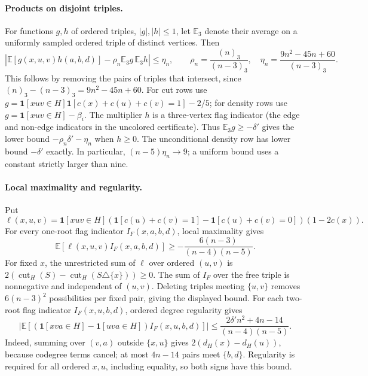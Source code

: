 \documentclass[11pt]{article}
\DeclareMathOperator{\cut}{cut}
\newcommand{\EE}{\mathbb E}
\newcommand{\ind}{\mathbf 1}
\newcommand{\fall}[2]{(#1)_{#2}}
\begin{document}
\begin{appendices}
\paragraph{Products on disjoint triples.}
For functions $g,h$ of ordered triples, $|g|,|h|\le1$, let $\EE_3$
denote their average on a uniformly sampled ordered triple of distinct
vertices. Then
\[
 \left|\EE[g(x,u,v)h(a,b,d)]-\rho_n\EE_3g\,\EE_3h\right|
 \le\eta_n,\qquad
 \rho_n=\frac{\fall n3}{\fall{n-3}3},\quad
 \eta_n=\frac{9n^2-45n+60}{\fall{n-3}3}.
\]
This follows by removing the pairs of triples that intersect, since
$\fall n3-\fall{n-3}3=9n^2-45n+60$.
For cut rows use
$g=\ind[xuv\in H]\ind[c(x)+c(u)+c(v)=1]-2/5$;
for density rows use $g=\ind[xuv\in H]-\beta_i$.
The multiplier $h$ is a three-vertex flag indicator (the edge and
non-edge indicators in the uncolored certificate). Thus
$\EE_3g\ge-\delta'$ gives the lower bound
$-\rho_n\delta'-\eta_n$ when $h\ge0$.
The unconditional density row has lower bound $-\delta'$ exactly.
In particular, $(n-5)\eta_n\to9$; a uniform bound uses a constant
strictly larger than nine.

\paragraph{Local maximality and regularity.}
Put
\[
 \ell(x,u,v)=\ind[xuv\in H]
 (\ind[c(u)+c(v)=1]-\ind[c(u)+c(v)=0])(1-2c(x)).
\]
For every one-root flag indicator $I_F(x,a,b,d)$, local maximality gives
\[
 \EE[\ell(x,u,v)I_F(x,a,b,d)]
 \ge-\frac{6(n-3)}{(n-4)(n-5)}.
\]
For fixed $x$, the unrestricted sum of $\ell$ over ordered $(u,v)$
is $2(\cut_H(S)-\cut_H(S\triangle\{x\}))\ge0$.
The sum of $I_F$ over the free triple is nonnegative and independent
of $(u,v)$. Deleting triples meeting $\{u,v\}$ removes
$6(n-3)^2$ possibilities per fixed pair, giving the displayed bound.
For each two-root flag indicator $I_F(x,u,b,d)$, ordered degree
regularity gives
\[
 \left|\EE[(\ind[xva\in H]-\ind[uva\in H])I_F(x,u,b,d)]\right|
 \le\frac{2\delta'n^2+4n-14}{(n-4)(n-5)}.
\]
Indeed, summing over $(v,a)$ outside $\{x,u\}$ gives
$2(d_H(x)-d_H(u))$, because codegree terms cancel; at most $4n-14$
pairs meet $\{b,d\}$. Regularity is required for all ordered $x,u$,
including equality, so both signs have this bound.


\end{appendices}
\end{document}

